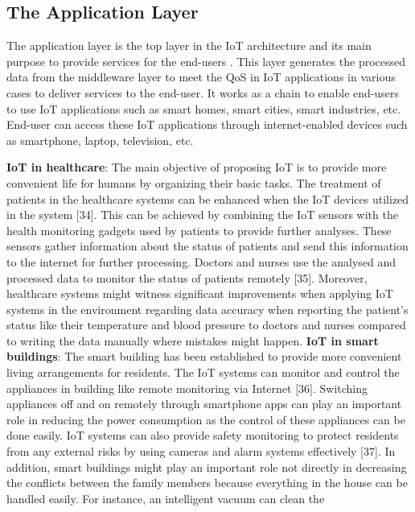 \documentclass[pmlr,twocolumn,10pt]{jmlr} %
\begin{document}
\subsection{The Application Layer }
The application layer is the top layer in the IoT 
architecture and its main purpose to provide services for the 
end-users . This layer generates the processed data from 
the middleware layer to meet the QoS in IoT applications in 
various cases to deliver services to the end-user. It works as 
a chain to enable end-users to use IoT applications such as 
smart homes, smart cities, smart industries, etc. End-user can 
access these IoT applications through internet-enabled 
devices such as smartphone, laptop, television, etc.

\newline 
\textbf{IoT in healthcare}: The main objective of proposing IoT is 
to provide more convenient life for humans by organizing 
their basic tasks. The treatment of patients in the healthcare 
systems can be enhanced when the IoT devices utilized in 
the system [34]. This can be achieved by combining the IoT 
sensors with the health monitoring gadgets used by patients 
to provide further analyses. These sensors gather 
information about the status of patients and send this 
information to the internet for further processing. Doctors 
and nurses use the analysed and processed data to monitor 
the status of patients remotely [35]. Moreover, healthcare 
systems might witness significant improvements when 
applying IoT systems in the environment regarding data 
accuracy when reporting the patient's status like their 
temperature and blood pressure to doctors and nurses 
compared to writing the data manually where mistakes 
might happen. 
\newline 
\textbf{IoT in smart buildings}: The smart building has been 
established to provide more convenient living arrangements 
for residents. The IoT systems can monitor and control the 
appliances in building like remote monitoring via Internet 
[36]. Switching appliances off and on remotely through 
smartphone apps can play an important role in reducing the 
power consumption as the control of these appliances can 
be done easily. IoT systems can also provide safety 
monitoring to protect residents from any external risks by 
using cameras and alarm systems effectively [37]. In 
addition, smart buildings might play an important role not 
directly in decreasing the conflicts between the family 
members because everything in the house can be handled 
easily. For instance, an intelligent vacuum can clean the 
\end{document}
